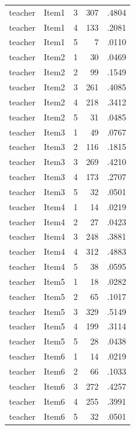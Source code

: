 {\begin{longtable}{llrrr}
teacher & Item1 & 3 & 307 & .4804 \\
teacher & Item1 & 4 & 133 & .2081 \\
teacher & Item1 & 5 & 7 & .0110 \\
teacher & Item2 & 1 & 30 & .0469 \\
teacher & Item2 & 2 & 99 & .1549 \\
teacher & Item2 & 3 & 261 & .4085 \\
teacher & Item2 & 4 & 218 & .3412 \\
teacher & Item2 & 5 & 31 & .0485 \\
teacher & Item3 & 1 & 49 & .0767 \\
teacher & Item3 & 2 & 116 & .1815 \\
teacher & Item3 & 3 & 269 & .4210 \\
teacher & Item3 & 4 & 173 & .2707 \\
teacher & Item3 & 5 & 32 & .0501 \\
teacher & Item4 & 1 & 14 & .0219 \\
teacher & Item4 & 2 & 27 & .0423 \\
teacher & Item4 & 3 & 248 & .3881 \\
teacher & Item4 & 4 & 312 & .4883 \\
teacher & Item4 & 5 & 38 & .0595 \\
teacher & Item5 & 1 & 18 & .0282 \\
teacher & Item5 & 2 & 65 & .1017 \\
teacher & Item5 & 3 & 329 & .5149 \\
teacher & Item5 & 4 & 199 & .3114 \\
teacher & Item5 & 5 & 28 & .0438 \\
teacher & Item6 & 1 & 14 & .0219 \\
teacher & Item6 & 2 & 66 & .1033 \\
teacher & Item6 & 3 & 272 & .4257 \\
teacher & Item6 & 4 & 255 & .3991 \\
teacher & Item6 & 5 & 32 & .0501 \\
\bottomrule
\end{longtable}
}
